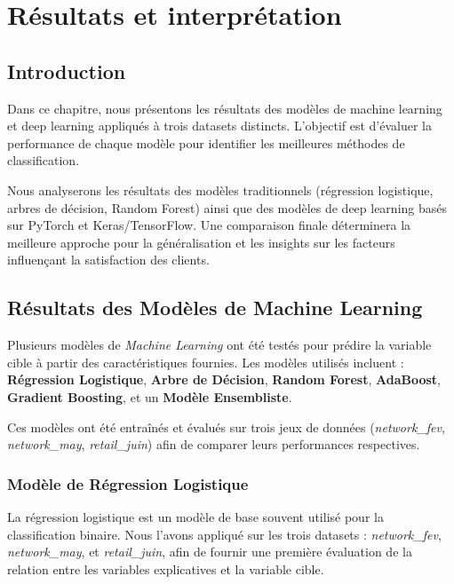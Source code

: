 \chapter{Résultats et interprétation}
\begin{spacing}{1.2}
\minitoc
\thispagestyle{MyStyle}
\end{spacing}
\newpage
\justifying

\sloppy {} 
\section{Introduction}
Dans ce chapitre, nous présentons les résultats des modèles de machine learning et deep learning appliqués à trois datasets distincts. L'objectif est d'évaluer la performance de chaque modèle pour identifier les meilleures méthodes de classification.

Nous analyserons les résultats des modèles traditionnels (régression logistique, arbres de décision, Random Forest) ainsi que des modèles de deep learning basés sur PyTorch et Keras/TensorFlow. Une comparaison finale déterminera la meilleure approche pour la généralisation et les insights sur les facteurs influençant la satisfaction des clients.
\section{Résultats des Modèles de Machine Learning}

Plusieurs modèles de \textit{Machine Learning} ont été testés pour prédire la variable cible à partir des caractéristiques fournies. Les modèles utilisés incluent : \textbf{Régression Logistique}, \textbf{Arbre de Décision}, \textbf{Random Forest}, \textbf{AdaBoost}, \textbf{Gradient Boosting}, et un \textbf{Modèle Ensembliste}.

Ces modèles ont été entraînés et évalués sur trois jeux de données (\textit{network\_fev}, \textit{network\_may}, \textit{retail\_juin}) afin de comparer leurs performances respectives.

\subsection{Modèle de Régression Logistique}

La régression logistique est un modèle de base souvent utilisé pour la classification binaire. Nous l'avons appliqué sur les trois datasets : \textit{network\_fev}, \textit{network\_may}, et \textit{retail\_juin}, afin de fournir une première évaluation de la relation entre les variables explicatives et la variable cible.

